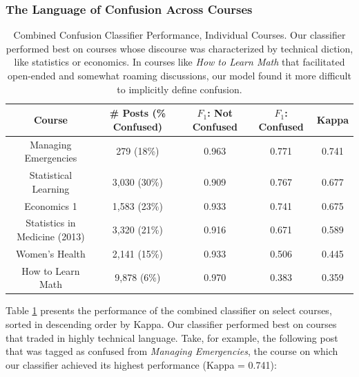 \documentclass{edm_template}
\begin{document}
\subsubsection{The Language of Confusion Across Courses}

\begin{table}
       \centering
       \begin{tabular}{|c|c|c|c|c|}
       \hline
       Course                         & \# Posts (\% Confused) & $F_{1}$: Not Confused & $F_{1}$: Confused & Kappa \\ \hline
       Managing Emergencies              & 279 (18\%)                         & 0.963                 & 0.771             & 0.741 \\ \hline
       Statistical Learning              & 3,030 (30\%)                        & 0.909                 & 0.767             & 0.677 \\ \hline
       Economics 1                       & 1,583 (23\%)                     & 0.933                 & 0.741             & 0.675 \\ \hline
       Statistics in Medicine (2013)     & 3,320 (21\%)                         & 0.916                 & 0.671             & 0.589 \\ \hline
       Women's Health                    & 2,141 (15\%)                         & 0.933                 & 0.506             & 0.445 \\ \hline
       How to Learn Math                 & 9,878 (6\%)                        & 0.970                 & 0.383             & 0.359 \\ \hline
       \end{tabular}
       \vspace{-5pt}
       \caption{\textnormal{
       Combined Confusion Classifier Performance, Individual Courses. Our classifier performed best on courses whose discourse was characterized by technical diction, like statistics or economics. In courses like \emph{How to Learn Math} that facilitated open-ended and somewhat roaming discussions, our model found it more difficult to implicitly define confusion. 
       }} %
       \label{table:confusion_courses} %
\end{table}

Table \ref{table:confusion_courses} presents the performance of the combined classifier on select courses, sorted in descending order by Kappa. Our classifier performed best on courses that traded in highly technical language. Take, for example, the following post that was tagged as confused from \emph{Managing Emergencies}, the course on which our classifier achieved its highest performance (Kappa = 0.741):
\end{document}

